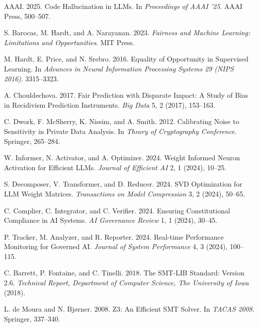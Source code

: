 \documentclass[manuscript,screen,review,anonymous,9pt]{acmart}
\begin{document}
\begin{thebibliography}{99}
AAAI. 2025.
\newblock Code Hallucination in LLMs.
\newblock In \emph{Proceedings of AAAI '25}. AAAI Press, 500--507.

S. Barocas, M. Hardt, and A. Narayanan. 2023.
\newblock \emph{Fairness and Machine Learning: Limitations and Opportunities}.
\newblock MIT Press.

M. Hardt, E. Price, and N. Srebro. 2016.
\newblock Equality of Opportunity in Supervised Learning.
\newblock In \emph{Advances in Neural Information Processing Systems 29 (NIPS 2016)}. 3315--3323.

A. Chouldechova. 2017.
\newblock Fair Prediction with Disparate Impact: A Study of Bias in Recidivism Prediction Instruments.
\newblock \emph{Big Data} 5, 2 (2017), 153--163.

C. Dwork, F. McSherry, K. Nissim, and A. Smith. 2012.
\newblock Calibrating Noise to Sensitivity in Private Data Analysis.
\newblock In \emph{Theory of Cryptography Conference}. Springer, 265--284.

W. Informer, N. Activator, and A. Optimizer. 2024.
\newblock Weight Informed Neuron Activation for Efficient LLMs.
\newblock \emph{Journal of Efficient AI} 2, 1 (2024), 10--25.

S. Decomposer, V. Transformer, and D. Reducer. 2024.
\newblock SVD Optimization for LLM Weight Matrices.
\newblock \emph{Transactions on Model Compression} 3, 2 (2024), 50--65.

C. Complier, C. Integrator, and C. Verifier. 2024.
\newblock Ensuring Constitutional Compliance in AI Systems.
\newblock \emph{AI Governance Review} 1, 1 (2024), 30--45.

P. Tracker, M. Analyzer, and R. Reporter. 2024.
\newblock Real-time Performance Monitoring for Governed AI.
\newblock \emph{Journal of System Performance} 4, 3 (2024), 100--115.

C. Barrett, P. Fontaine, and C. Tinelli. 2018.
\newblock The SMT-LIB Standard: Version 2.6.
\newblock \emph{Technical Report, Department of Computer Science, The University of Iowa} (2018).

L. de Moura and N. Bjørner. 2008.
\newblock Z3: An Efficient SMT Solver.
\newblock In \emph{TACAS 2008}. Springer, 337--340.


\end{thebibliography}
\end{document}
